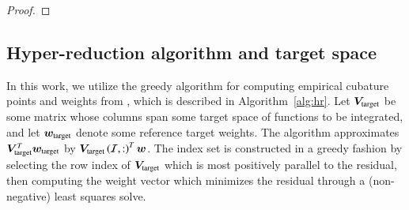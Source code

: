 \documentclass[preprint,10pt]{elsarticle}
\theoremstyle{definition}
\theoremstyle{lemma}
\theoremstyle{theorem}
\theoremstyle{assumption}
\newcommand{\nor}[1]{\left\| #1 \right\|}
\newcommand{\LRp}[1]{\left( #1 \right)}
\begin{document}
\begin{proof}
 \end{proof}
 


\subsection{Hyper-reduction algorithm and target space}
\label{sec:hyperreducalgo}

In this work, we utilize the greedy algorithm for computing empirical cubature points and weights from \cite{an2008optimizing, hernandez2017dimensional}, which is described in Algorithm~\ref{alg:hr}.  Let $\bm{V}_{\rm target}$ be some matrix whose columns span some target space of functions to be integrated, and let $\bm{w}_{\rm target}$ denote some reference target weights.  The algorithm approximates $\bm{V}_{\rm target}^T\bm{w}_{\rm target}$ by $\bm{V}_{\rm target}\LRp{\mathcal{I},:}^T\bm{w}$.  The index set is constructed in a greedy fashion by selecting the row index of $\bm{V}_{\rm target}$ which is most positively parallel to the residual, then computing the weight vector which minimizes the residual through a (non-negative) least squares solve.  
\end{document}
